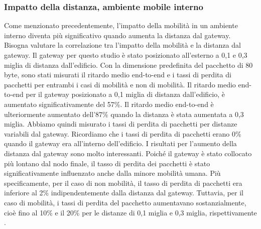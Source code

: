 \documentclass[a4paper]{report} %
\begin{document}
\subsubsection{Impatto della distanza, ambiente mobile interno}
Come menzionato precedentemente, l'impatto della mobilità in un ambiente interno diventa più significativo quando aumenta la distanza dal gateway. Bisogna valutare la correlazione tra l'impatto della mobilità e la distanza dal gateway. Il gateway per questo studio è stato posizionato all'esterno a 0,1 e 0,3 miglia di distanza dall'edificio. Con la dimensione predefinita del pacchetto di 80 byte, sono stati misurati il ritardo medio end-to-end e i tassi di perdita di pacchetti per entrambi i casi di mobilità e non di mobilità. Il ritardo medio end-to-end per il gateway posizionato a 0,1 miglia di distanza dall'edificio, è aumentato significativamente del 57\%. Il ritardo medio end-to-end è ulteriormente aumentato dell'87\% quando la distanza è stata aumentata a 0,3 miglia. Abbiamo quindi misurato i tassi di perdita di pacchetti per distanze variabili dal gateway. Ricordiamo che i tassi di perdita di pacchetti erano 0\% quando il gateway era all'interno dell'edificio. I risultati per l'aumento della distanza dal gateway sono molto interessanti. Poiché il gateway è stato collocato più lontano dal nodo finale, il tasso di perdita dei pacchetti è stato significativamente influenzato anche dalla minore mobilità umana. Più specificamente, per il caso di non mobilità, il tasso di perdita di pacchetti era inferiore al 2\% indipendentemente dalla distanza dal gateway. Tuttavia, per il caso di mobilità, i tassi di perdita del pacchetto aumentavano sostanzialmente, cioè fino al 10\% e il 20\% per le distanze di 0,1 miglia e 0,3 miglia, rispettivamente \cite{art:rif.47}.
\end{document}
